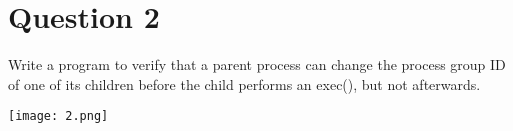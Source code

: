 \documentclass[main.tex]{subfiles}
\begin{document}
\section{Question 2}

Write a program to verify that a parent process can change the process group ID
of one of its children before the child performs an exec(), but not afterwards.





\centering\texttt{[image: 2.png]}
\clearpage
\end{document}
